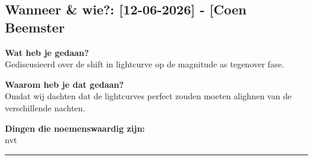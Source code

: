 
\subsection*{Wanneer \& wie?: [12-06-2026] - [Coen Beemster}

\textbf{Wat heb je gedaan?}\\
Gediscusieerd over de shift in lightcurve op de magnitude as tegenover fase.
\vspace{0.3cm} 

\noindent \textbf{Waarom heb je dat gedaan?}\\
Omdat wij dachten dat de lightcurves perfect zouden moeten alighnen van de verschillende nachten.

\noindent \textbf{Dingen die noemenswaardig zijn:}\\
nvt


\vspace{0.5cm}
\hrule 
\vspace{0.5cm}
